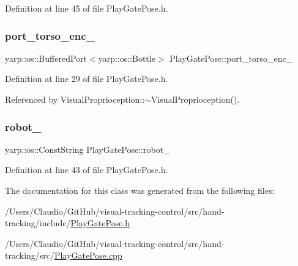 Definition at line 45 of file Play\+Gate\+Pose.\+h.

\mbox{\label{classPlayGatePose_a95364e89c1f231c8f1c6c446c59c60a1}} 
\subsubsection{\texorpdfstring{port\+\_\+torso\+\_\+enc\+\_\+}{port\_torso\_enc\_}}
{\footnotesize\ttfamily yarp\+::os\+::\+Buffered\+Port$<$yarp\+::os\+::\+Bottle$>$ Play\+Gate\+Pose\+::port\+\_\+torso\+\_\+enc\+\_\+\hspace{0.3cm}{\ttfamily [protected]}}



Definition at line 29 of file Play\+Gate\+Pose.\+h.



Referenced by Visual\+Proprioception\+::$\sim$\+Visual\+Proprioception().

\mbox{\label{classPlayGatePose_aa4015d529ba3c0cb9306e2c67cec3bb2}} 
\subsubsection{\texorpdfstring{robot\+\_\+}{robot\_}}
{\footnotesize\ttfamily yarp\+::os\+::\+Const\+String Play\+Gate\+Pose\+::robot\+\_\+\hspace{0.3cm}{\ttfamily [private]}}



Definition at line 43 of file Play\+Gate\+Pose.\+h.



The documentation for this class was generated from the following files\+:\begin{DoxyCompactItemize}
\item 
/\+Users/\+Claudio/\+Git\+Hub/visual-\/tracking-\/control/src/hand-\/tracking/include/\hyperlink{PlayGatePose_8h}{Play\+Gate\+Pose.\+h}\item 
/\+Users/\+Claudio/\+Git\+Hub/visual-\/tracking-\/control/src/hand-\/tracking/src/\hyperlink{PlayGatePose_8cpp}{Play\+Gate\+Pose.\+cpp}\end{DoxyCompactItemize}
